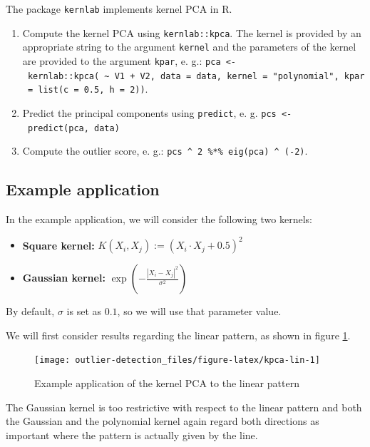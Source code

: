 \documentclass[]{report}
\providecommand{\tightlist}{%
  \setlength{\itemsep}{0pt}\setlength{\parskip}{0pt}}
\theoremstyle{definition}
\theoremstyle{definition}
\theoremstyle{definition}
\theoremstyle{remark}
\begin{document}
The package \texttt{kernlab} \citep{kernlab} implements kernel PCA in R.

\begin{enumerate}
\def\labelenumi{\arabic{enumi}.}
\tightlist
\item
  Compute the kernel PCA using \texttt{kernlab::kpca}. The kernel is
  provided by an appropriate string to the argument \texttt{kernel} and
  the parameters of the kernel are provided to the argument
  \texttt{kpar}, e. g.:
  \texttt{pca\ \textless{}-\ kernlab::kpca(\ \textasciitilde{}\ V1\ +\ V2,\ data\ =\ data,\ kernel\ =\ "polynomial",\ kpar\ =\ list(c\ =\ 0.5,\ h\ =\ 2))}.
\item
  Predict the principal components using \texttt{predict}, e. g.
  \texttt{pcs\ \textless{}-\ predict(pca,\ data)}
\item
  Compute the outlier score, e. g.:
  \texttt{pcs\ \^{}\ 2\ \%*\%\ eig(pca)\ \^{}\ (-2)}.
\end{enumerate}

\hypertarget{example-application-2}{%
\subsection{Example application}\label{example-application-2}}

In the example application, we will consider the following two kernels:

\begin{itemize}
\tightlist
\item
  \textbf{Square kernel:} \(K(X_i,X_j):=(X_i\cdot X_j+0.5)^2\)
\item
  \textbf{Gaussian kernel:} \(\exp(-\frac{|X_i-X_j|^2}{\sigma^2})\)
\end{itemize}

By default, \(\sigma\) is set as \(0.1\), so we will use that parameter
value.

We will first consider results regarding the linear pattern, as shown in
figure \ref{fig:kpca-lin}.

\begin{figure}

{\centering \texttt{[image: outlier-detection\_files/figure-latex/kpca-lin-1]} 

}

\caption{Example application of the kernel PCA to the linear pattern}\label{fig:kpca-lin}
\end{figure}

The Gaussian kernel is too restrictive with respect to the linear
pattern and both the Gaussian and the polynomial kernel again regard
both directions as important where the pattern is actually given by the
line.
\end{document}
